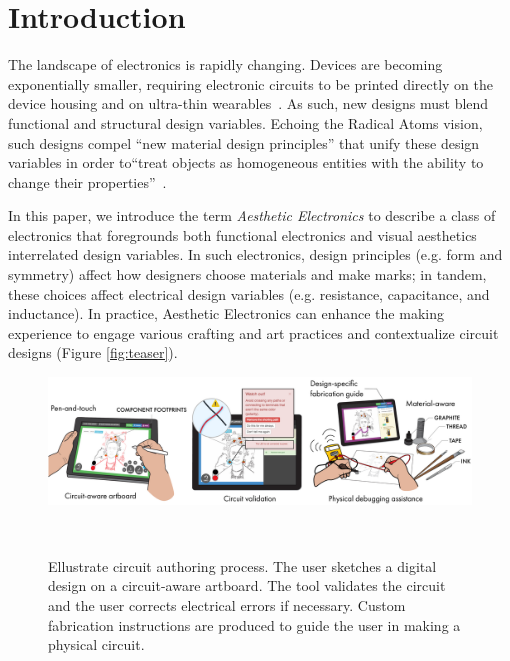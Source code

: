 \documentclass{sigchi}
\begin{document}

\section{Introduction}

The landscape of electronics is rapidly changing. Devices are becoming exponentially smaller, requiring electronic circuits to be printed directly on the device housing and on ultra-thin wearables~\cite{MacDonald:2014ju,Kim:2014iq}. As such, new designs must blend functional and structural design variables. Echoing the Radical Atoms vision, such designs compel ``new material design principles'' that unify these design variables in order to``treat objects as homogeneous entities with the ability to change their properties''~\cite{Ishii:2012fg}. 

In this paper, we introduce the term \textit{Aesthetic Electronics} to describe a class of electronics that foregrounds both functional electronics and visual aesthetics interrelated design variables. In such electronics, design principles (e.g. form and symmetry) affect how designers choose materials and make marks; in tandem, these choices affect electrical design variables (e.g. resistance, capacitance, and inductance). In practice, Aesthetic Electronics can enhance the making experience to engage various crafting and art practices and contextualize circuit designs (Figure \ref{fig:teaser}).
\begin{figure}[ht]
 \vspace{-16pt}
\centering
  \includegraphics[width=\linewidth]{figures/ellustrate_system.pdf}
  \caption{Ellustrate circuit authoring process. The user sketches a digital design on a circuit-aware artboard. The tool validates the circuit and the user corrects electrical errors if necessary. Custom fabrication instructions are produced to guide the user in making a physical circuit.}~\label{fig:process_flow}
  \vspace{-16pt}
\end{figure}
\end{document}
